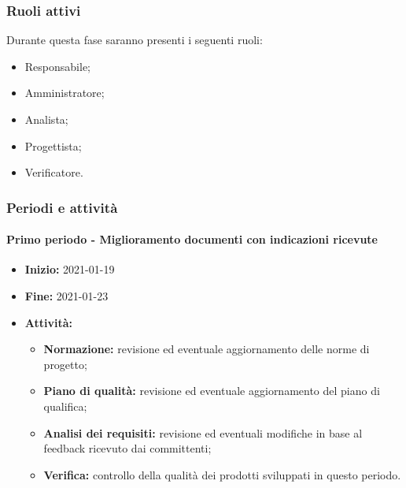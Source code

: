 \subsubsection{Ruoli attivi}
Durante questa fase saranno presenti i seguenti ruoli:
\begin{itemize}
    \item Responsabile;
    \item Amministratore;
    \item Analista;
    \item Progettista;
    \item Verificatore.
\end{itemize}

\subsubsection{Periodi e attività}

\paragraph[Primo periodo]{Primo periodo - \textnormal{Miglioramento documenti con indicazioni ricevute}}
\begin{itemize}
    \item [] \textbf{Inizio:} 2021-01-19
    \item [] \textbf{Fine:} 2021-01-23
    \item [] \textbf{Attività:}
          \begin{itemize}
              \item \textbf{Normazione:} revisione ed eventuale aggiornamento delle norme di progetto;
              \item \textbf{Piano di qualità:} revisione ed eventuale aggiornamento del piano di qualifica;
              \item \textbf{Analisi dei requisiti:} revisione ed eventuali modifiche in base al feedback ricevuto dai committenti;
              \item \textbf{Verifica:} controllo della qualità dei prodotti sviluppati in questo periodo.
          \end{itemize}
\end{itemize}

